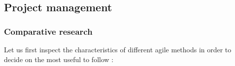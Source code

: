 \subsection{Project management }
\subsubsection{Comparative research }

\hspace{7mm}Let us first inspect the characteristics of different agile methods in order to decide on the most useful to follow :


